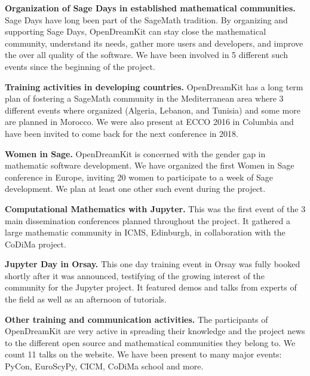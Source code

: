 \documentclass{deliverablereport}
\begin{document}
\begin{compactitem}
\item \textbf{Organization of Sage Days in established mathematical communities.} Sage Days have long been
part of the SageMath tradition. By organizing and supporting Sage Days, OpenDreamKit can stay close
the mathematical community, understand its needs, gather more users and developers, and improve
the over all quality of the software. We have been involved in 5 different such events since the beginning 
of the project.
\item \textbf{Training activities in developing countries.} OpenDreamKit has a long term plan of fostering
a SageMath community in the Mediterranean area where 3 different events where organized (Algeria, Lebanon, and Tunisia) 
and some more are planned in Morocco. We were also present at ECCO 2016 in Columbia and have been invited
to come back for the next conference in 2018. 
\item \textbf{Women in Sage.} OpenDreamKit is concerned with the gender gap in mathematic software development. 
We have organized the first Women in Sage conference in Europe, inviting 20 women to participate to a week of Sage development. We plan at least one other such event during the project.
\item \textbf{Computational Mathematics with Jupyter.} This was the first event of the 3 main dissemination conferences
planned throughout the project. It gathered a large mathematic community in ICMS, Edinburgh, in collaboration with the CoDiMa project.
\item \textbf{Jupyter Day in Orsay.} This one day training event in Orsay was fully booked shortly after it was announced, testifying of the growing interest of the community for the Jupyter project. It featured demos and talks from experts of the field as well as an afternoon of tutorials. 
\item \textbf{Other training and communication activities.} The participants of OpenDreamKit are very active
in spreading their knowledge and the project news to the different open source and mathematical communities they belong to. We count 11 talks on the website. We have been present to many major events: PyCon, EuroScyPy, CICM, CoDiMa school and more. 
\end{compactitem}

\paragraph{}
\end{document}
